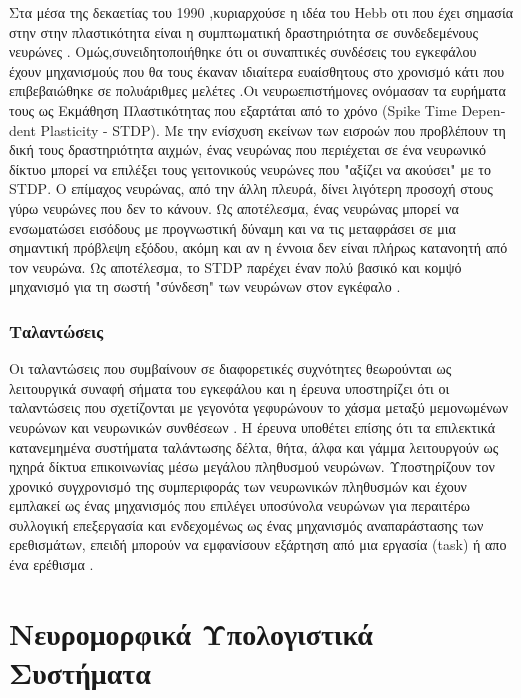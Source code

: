 \documentclass[12pt]{report}
\begin{document}
Στα μέσα της δεκαετίας του 1990 ,κυριαρχούσε η ιδέα του \textlatin{Hebb} οτι που έχει σημασία στην στην πλαστικότητα είναι η συμπτωματική δραστηριότητα σε συνδεδεμένους νευρώνες . Ομώς,συνειδητοποιήθηκε ότι οι συναπτικές συνδέσεις του εγκεφάλου έχουν μηχανισμούς που θα τους έκαναν ιδιαίτερα ευαίσθητους στο χρονισμό κάτι που επιβεβαιώθηκε σε πολυάριθμες μελέτες  \cite{markram1995}\cite{markram1997}\cite{Gerstner1996} .Οι νευρωεπιστήμονες ονόμασαν τα ευρήματα τους ως Εκμάθηση Πλαστικότητας που εξαρτάται από το χρόνο (\textlatin{Spike Time Dependent Plasticity -  STDP}). Με την ενίσχυση εκείνων των εισροών που προβλέπουν τη δική τους δραστηριότητα αιχμών, ένας νευρώνας που περιέχεται σε ένα νευρωνικό δίκτυο μπορεί να επιλέξει τους γειτονικούς νευρώνες που "αξίζει να ακούσει" με το \textlatin{STDP}. Ο επίμαχος νευρώνας, από την άλλη πλευρά, δίνει λιγότερη προσοχή στους γύρω νευρώνες που δεν το κάνουν. Ως αποτέλεσμα, ένας νευρώνας μπορεί να ενσωματώσει εισόδους με προγνωστική δύναμη και να τις μεταφράσει σε μια σημαντική πρόβλεψη εξόδου, ακόμη και αν η έννοια δεν είναι πλήρως κατανοητή από τον νευρώνα. Ως αποτέλεσμα, το \textlatin{STDP} παρέχει έναν πολύ βασικό και κομψό μηχανισμό για τη σωστή "σύνδεση" των νευρώνων στον εγκέφαλο \cite{Markram2012}.

\subsection{Ταλαντώσεις}
Οι ταλαντώσεις που συμβαίνουν σε διαφορετικές συχνότητες θεωρούνται ως λειτουργικά συναφή σήματα του εγκεφάλου και η έρευνα υποστηρίζει ότι οι ταλαντώσεις που σχετίζονται με γεγονότα γεφυρώνουν το χάσμα μεταξύ μεμονωμένων νευρώνων και νευρωνικών συνθέσεων \cite{Basar2000}. Η έρευνα υποθέτει επίσης ότι τα επιλεκτικά κατανεμημένα συστήματα ταλάντωσης δέλτα, θήτα, άλφα και γάμμα λειτουργούν ως ηχηρά δίκτυα επικοινωνίας μέσω μεγάλου πληθυσμού νευρώνων. Υποστηρίζουν τον χρονικό συγχρονισμό της συμπεριφοράς των νευρωνικών πληθυσμών και έχουν εμπλακεί ως ένας μηχανισμός που επιλέγει υποσύνολα νευρώνων για περαιτέρω συλλογική επεξεργασία και ενδεχομένως ως ένας μηχανισμός αναπαράστασης των ερεθισμάτων, επειδή μπορούν να εμφανίσουν εξάρτηση από μια εργασία (\textlatin{task}) ή απο ένα ερέθισμα \cite{Singer1995} \cite{Singer1999}.

\chapter{Νευρομορφικά Υπολογιστικά Συστήματα}
\end{document}
